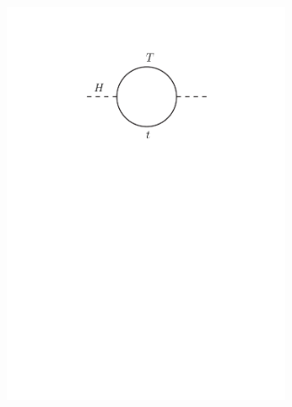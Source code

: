 \begin{figure}[h!]
\begin{subfigure}{0.33\textwidth}
  \includegraphics[width=0.9\textwidth]{figures/Theory/loop_topT_good.pdf}
  \caption{}
  \label{}
\end{subfigure}
\begin{subfigure}{0.33\textwidth}
  \centering

\end{subfigure}
\end{figure}
